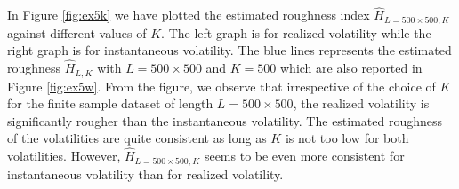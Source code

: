 \documentclass{article}
\begin{document}
In Figure \ref{fig:ex5k} we have plotted the estimated roughness index $\hat{H}_{L=500\times 500,K}$ against different values of $K$. The left graph is for realized volatility while the right graph is for instantaneous volatility. The blue lines represents the estimated roughness $\hat{H}_{L,K}$ with $L=500\times 500$ and $K=500$ which are also reported in Figure \ref{fig:ex5w}. From the figure, we observe that irrespective of the choice of $K$ for the finite sample dataset of length $L=500\times 500$, the realized volatility is significantly rougher than the instantaneous volatility. The estimated roughness of the volatilities are quite consistent as long as $K$ is not too low for both volatilities. However, $\hat{H}_{L=500\times 500,K}$ seems to be even more consistent for instantaneous volatility than for realized volatility.
\begin{figure}[htbp]
    \centering
    

\end{figure}
\end{document}
